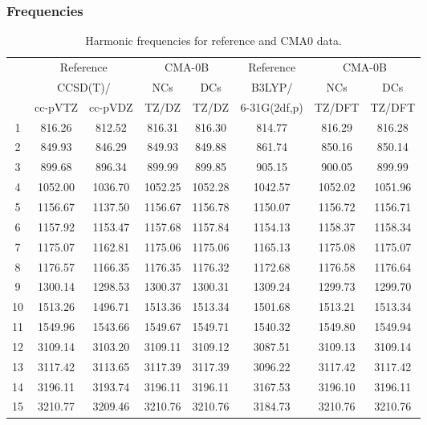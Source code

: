 \documentclass[10pt,oneside]{article}
\begin{document}
\subsubsection*{Frequencies}
\begin{table}[h!]
\centering
\caption{Harmonic frequencies for reference and CMA0 data.}
\begin{tabular}{cccccccc}
\toprule
{} & \multicolumn{2}{c}{Reference} & \multicolumn{2}{c}{CMA-0B} &    Reference & \multicolumn{2}{c}{CMA-0B} \\
{} & \multicolumn{2}{c}{CCSD(T)/} &     NCs &     DCs &       B3LYP/ &     NCs &     DCs \\
{} &   cc-pVTZ & cc-pVDZ &   TZ/DZ &   TZ/DZ & 6-31G(2df,p) &  TZ/DFT &  TZ/DFT \\
\midrule
1  &    816.26 &  812.52 &  816.31 &  816.30 &       814.77 &  816.29 &  816.28 \\
2  &    849.93 &  846.29 &  849.93 &  849.88 &       861.74 &  850.16 &  850.14 \\
3  &    899.68 &  896.34 &  899.99 &  899.85 &       905.15 &  900.05 &  899.99 \\
4  &   1052.00 & 1036.70 & 1052.25 & 1052.28 &      1042.57 & 1052.02 & 1051.96 \\
5  &   1156.67 & 1137.50 & 1156.67 & 1156.78 &      1150.07 & 1156.72 & 1156.71 \\
6  &   1157.92 & 1153.47 & 1157.68 & 1157.84 &      1154.13 & 1158.37 & 1158.34 \\
7  &   1175.07 & 1162.81 & 1175.06 & 1175.06 &      1165.13 & 1175.08 & 1175.07 \\
8  &   1176.57 & 1166.35 & 1176.35 & 1176.32 &      1172.68 & 1176.58 & 1176.64 \\
9  &   1300.14 & 1298.53 & 1300.37 & 1300.31 &      1309.24 & 1299.73 & 1299.70 \\
10 &   1513.26 & 1496.71 & 1513.36 & 1513.34 &      1501.68 & 1513.21 & 1513.34 \\
11 &   1549.96 & 1543.66 & 1549.67 & 1549.71 &      1540.32 & 1549.80 & 1549.94 \\
12 &   3109.14 & 3103.20 & 3109.11 & 3109.12 &      3087.51 & 3109.13 & 3109.14 \\
13 &   3117.42 & 3113.65 & 3117.39 & 3117.39 &      3096.22 & 3117.42 & 3117.42 \\
14 &   3196.11 & 3193.74 & 3196.11 & 3196.11 &      3167.53 & 3196.10 & 3196.11 \\
15 &   3210.77 & 3209.46 & 3210.76 & 3210.76 &      3184.73 & 3210.76 & 3210.76 \\
\bottomrule
\end{tabular}
\end{table}
\end{document}
